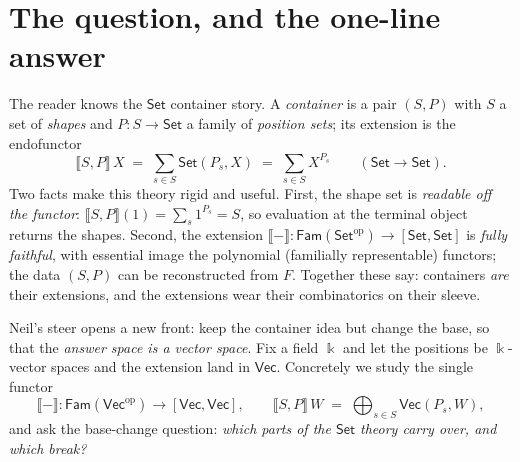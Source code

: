 \documentclass[11pt]{amsart}
\theoremstyle{plain}
\theoremstyle{definition}
\renewcommand{\Vec}{\mathsf{Vec}}
\newcommand{\Set}{\mathsf{Set}}
\newcommand{\Fam}{\mathsf{Fam}}
\newcommand{\op}{\mathrm{op}}
\newcommand{\ext}[1]{\llbracket #1 \rrbracket}
\newcommand{\fld}{\Bbbk}
\newcommand{\bul}{{-}}
\begin{document}
\section{The question, and the one-line answer}

The reader knows the $\Set$ container story. A \emph{container} is a pair
$(S,P)$ with $S$ a set of \emph{shapes} and $P\colon S \to \Set$ a family of
\emph{position sets}; its extension is the endofunctor
\[
  \ext{S,P}\,X \;=\; \sum_{s\in S} \Set(P_s, X) \;=\; \sum_{s\in S} X^{P_s}
  \qquad (\Set \to \Set).
\]
Two facts make this theory rigid and useful. First, the shape set is
\emph{readable off the functor}: $\ext{S,P}(1) = \sum_s 1^{P_s} = S$, so
evaluation at the terminal object returns the shapes. Second, the extension
$\ext{\bul}\colon \Fam(\Set^\op) \to [\Set,\Set]$ is \emph{fully faithful},
with essential image the polynomial (familially representable) functors; the
data $(S,P)$ can be reconstructed from $F$. Together these say: containers
\emph{are} their extensions, and the extensions wear their combinatorics on
their sleeve.

Neil's steer opens a new front: keep the container idea but change the base,
so that the \emph{answer space is a vector space}. Fix a field $\fld$ and let the
positions be $\fld$-vector spaces and the extension land in $\Vec$. Concretely
we study the single functor
\[
  \ext{\bul}\colon \Fam(\Vec^\op) \longrightarrow [\Vec,\Vec],
  \qquad
  \ext{S,P}\,W \;=\; \bigoplus_{s\in S} \Vec(P_s, W),
\]
and ask the base-change question: \emph{which parts of the $\Set$ theory carry
over, and which break?}
\end{document}
